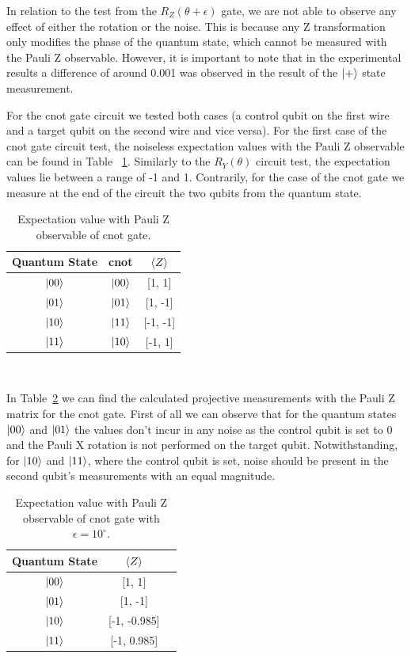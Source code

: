 In relation to the test from the \(R_{Z}(\theta + \epsilon)\) gate, we
are not able to observe any effect of either the rotation or the noise.
This is because any Z transformation only modifies the phase of the
quantum state, which cannot be measured with the Pauli Z observable.
However, it is important to note that in the experimental results
a difference of around 0.001 was observed in the result of the \(\ket{+}\)
state measurement. \

For the \ac{cnot} gate circuit we tested both cases (a control qubit on the
first wire and a target qubit on the second wire and vice versa). For
the first case of the \ac{cnot}  gate circuit test, the noiseless expectation
values with the Pauli Z observable can be found in Table
~\ref{tab:cnot_ideal}. Similarly to the \(R_{Y}(\theta)\) circuit test,
the expectation values lie between a range of -1 and 1. Contrarily,
for the case of the \ac{cnot}  gate we measure at the end of the circuit the
two qubits from the quantum state. \

\begin{table}[h]
  \centering
  \begin{tabular}{|c|c|c|}
    \hline
    Quantum State & \ac{cnot} & \(\expval{Z}\) \\
    \hline
    \(\ket{00}\) & \(\ket{00}\) & [1, 1] \\
    \hline
    \(\ket{01}\) & \(\ket{01}\) & [1, -1] \\
    \hline
    \(\ket{10}\) & \(\ket{11}\) & [-1, -1] \\
    \hline
    \(\ket{11}\) & \(\ket{10}\) & [-1, 1] \\
    \hline
  \end{tabular}
  \caption{Expectation value with Pauli Z observable of \ac{cnot} gate.}\label{tab:cnot_ideal}
\end{table} \

In Table~\ref{tab:cnot_iso_noise} we can find the calculated
projective measurements with the Pauli Z matrix for the \ac{cnot} gate.
First of all we can observe that for the quantum states \(\ket{00}\)
and \(\ket{01}\) the values don't incur in any noise as the control
qubit is set to 0 and the Pauli X rotation is not performed on the target
qubit. Notwithstanding, for \(\ket{10}\) and \(\ket{11}\), where the
control qubit is set, noise should be present in the second qubit's
measurements with an equal magnitude. \

\begin{table}[h]
  \centering
  \begin{tabular}{|c|c|c|}
    \hline
    Quantum State & \(\expval{Z}\) \\
    \hline
    \(\ket{00}\) & [1, 1] \\
    \hline
    \(\ket{01}\) & [1, -1] \\
    \hline
    \(\ket{10}\) & [-1, -0.985] \\
    \hline
    \(\ket{11}\) & [-1, 0.985] \\
    \hline
  \end{tabular}
  \caption{Expectation value with Pauli Z observable of \ac{cnot} gate with \(\epsilon = 10^{\circ}\).}\label{tab:cnot_iso_noise}
\end{table} \

